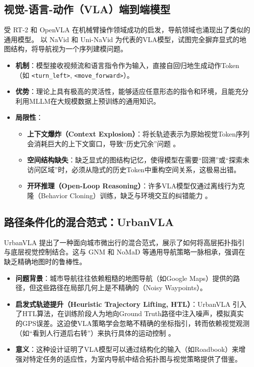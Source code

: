 \subsection{视觉-语言-动作（VLA）端到端模型}
受 RT-2 \cite{brohan2023rt2} 和 OpenVLA \cite{kim2024openvla} 在机械臂操作领域成功的启发，导航领域也涌现出了类似的通用模型。
以 NaVid 和 Uni-NaVid \cite{uni_navid} 为代表的VLA模型，试图完全摒弃显式的地图结构，将导航视为一个序列建模问题。
\begin{itemize}
    \item \textbf{机制}：模型接收视频流和语言指令作为输入，直接自回归地生成动作Token（如 \texttt{<turn\_left>}, \texttt{<move\_forward>}）。
    \item \textbf{优势}：理论上具有极高的灵活性，能够适应任意形态的指令和环境，且能充分利用MLLM在大规模数据上预训练的通用知识。
    \item \textbf{局限性}：
    \begin{itemize}
        \item \textbf{上下文爆炸（Context Explosion）}：将长轨迹表示为原始视觉Token序列会消耗巨大的上下文窗口，导致“历史冗余”问题  。
        \item \textbf{空间结构缺失}：缺乏显式的图结构记忆，使得模型在需要“回溯”或“探索未访问区域”时，必须从隐式的历史Token中重构空间关系，这极易出错。
        \item \textbf{开环推理（Open-Loop Reasoning）}：许多VLA模型仅通过离线行为克隆（Behavior Cloning）训练，缺乏与环境交互的纠错能力  。
    \end{itemize}
\end{itemize}

\subsection{路径条件化的混合范式：UrbanVLA}
UrbanVLA \cite{urbanvla} 提出了一种面向城市微出行的混合范式，展示了如何将高层拓扑指引与底层视觉控制结合。这与 GNM \cite{shah2023gnm} 和 NoMaD \cite{sridhar2024nomad} 等通用导航策略一脉相承，强调在缺乏精确地图时的鲁棒性。
\begin{itemize}
    \item \textbf{问题背景}：城市导航往往依赖粗糙的地图导航（如Google Maps）提供的路径，但这些路径在局部几何上是不精确的（Noisy Waypoints）。
    \item \textbf{启发式轨迹提升（Heuristic Trajectory Lifting, HTL）}：UrbanVLA 引入了HTL算法，在训练阶段人为地向Ground Truth路径中注入噪声，模拟真实的GPS误差。这迫使VLA策略学会忽略不精确的坐标指引，转而依赖视觉观测（如“看到人行道后右转”）来执行具体的运动控制 \cite{urbanvla}。
    \item \textbf{意义}：这种设计证明了VLA模型可以通过结构化的输入（如Roadbook）来增强对特定任务的适应性，为室内导航中结合拓扑图与视觉策略提供了借鉴。
\end{itemize}

